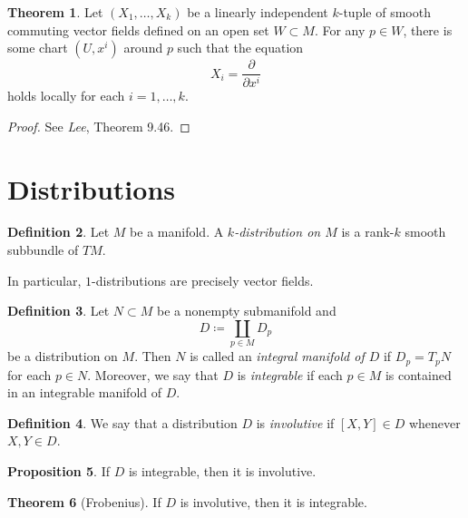 \documentclass[10pt,letterpaper,cm]{nupset}
\theoremstyle{definition}
\newtheorem{definition}{Definition}[subsection]
\theoremstyle{theorem}
\newtheorem{theorem}[definition]{Theorem}
\newtheorem{prop}[definition]{Proposition}
\theoremstyle{remark}
\newcommand{\1}{\mathbf{1}}
\newcommand{\0}{\vec 0}
\begin{document}
\begin{theorem}
Let $(X_1, \ldots, X_k)$ be a linearly independent $k$-tuple of smooth commuting vector fields defined on an open set $W\subset M$. For any $p\in W$, there is some chart $(U, x^i)$ around $p$ such that the equation $$X_i = \frac{\partial}{\partial{x^i}}$$ holds locally for each $i=1, \ldots, k$.
\end{theorem}
\begin{proof}
See \textit{Lee}, Theorem 9.46.
\end{proof}

\section{Distributions}

\begin{definition}
Let $M$ be a manifold. A \textit{$k$-distribution on $M$} is a rank-$k$ smooth subbundle of $TM$.
\end{definition}

In particular, $1$-distributions are precisely vector fields. 


\begin{definition}
Let $N\subset M$ be a nonempty submanifold and $$D \coloneqq \coprod_{p\in M}D_p$$ be a distribution on $M$. Then $N$ is called an \textit{integral manifold of $D$} if $D_p = T_pN$ for each $p\in N$. Moreover, we say that $D$ is \textit{integrable} if each $p\in M$ is contained in an integrable manifold of $D$.  
\end{definition}

\begin{definition}
We say that a distribution $D$ is \textit{involutive} if $[X,Y]\in D$ whenever $X,Y \in D$. 
\end{definition}

\begin{prop}
If $D$ is integrable, then it is involutive.
\end{prop}

\begin{theorem}[Frobenius]
If $D$ is involutive, then it is integrable. 
\end{theorem}
\end{document}

